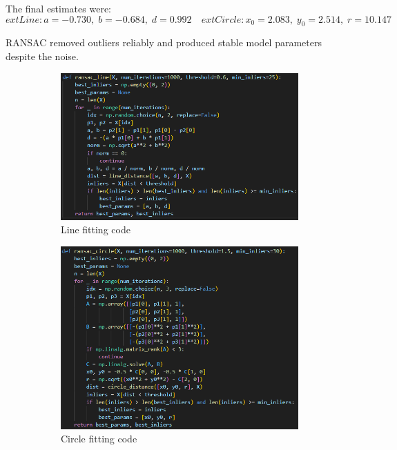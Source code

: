 \documentclass[11pt,a4paper]{article}
\begin{document}
The final estimates were:
\[
	ext{Line: } a=-0.730,\; b=-0.684,\; d=0.992
\quad
	ext{Circle: } x_0=2.083,\; y_0=2.514,\; r=10.147
\]

RANSAC removed outliers reliably and produced stable model parameters despite the noise.

\begin{figure}[H]\centering
\begin{subfigure}{0.23\textwidth}
\includegraphics[width=\linewidth]{images/q2_1_code.png}
\caption{Line fitting code}
\end{subfigure}
\begin{subfigure}{0.23\textwidth}
\includegraphics[width=\linewidth]{images/q2_2_code.png}
\caption{Circle fitting code}
\end{subfigure}
\begin{subfigure}{0.23\textwidth}

\end{subfigure}
\end{figure}
\end{document}
